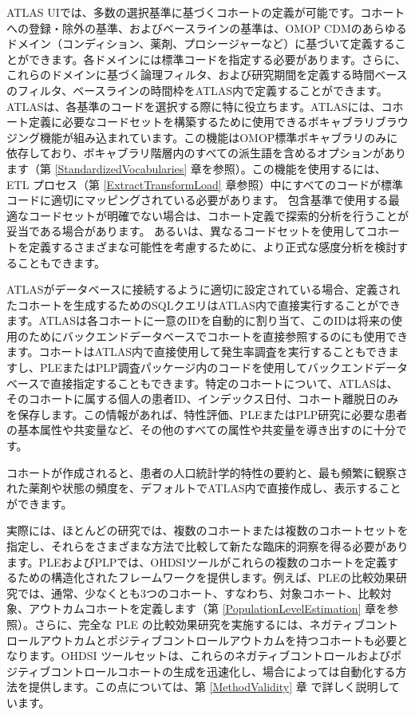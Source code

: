 \documentclass[
  11pt]{book}
\theoremstyle{definition}
\theoremstyle{definition}
\theoremstyle{definition}
\theoremstyle{definition}
\theoremstyle{remark}
\begin{document}
ATLAS UIでは、多数の選択基準に基づくコホートの定義が可能です。コホートへの登録・除外の基準、およびベースラインの基準は、OMOP CDMのあらゆるドメイン（コンディション、薬剤、プロシージャーなど）に基づいて定義することができます。各ドメインには標準コードを指定する必要があります。さらに、これらのドメインに基づく論理フィルタ、および研究期間を定義する時間ベースのフィルタ、ベースラインの時間枠をATLAS内で定義することができます。ATLASは、各基準のコードを選択する際に特に役立ちます。ATLASには、コホート定義に必要なコードセットを構築するために使用できるボキャブラリブラウジング機能が組み込まれています。この機能はOMOP標準ボキャブラリのみに依存しており、ボキャブラリ階層内のすべての派生語を含めるオプションがあります（第 \ref{StandardizedVocabularies} 章を参照）。この機能を使用するには、ETL プロセス（第 \ref{ExtractTransformLoad} 章参照）中にすべてのコードが標準コードに適切にマッピングされている必要があります。 包含基準で使用する最適なコードセットが明確でない場合は、コホート定義で探索的分析を行うことが妥当である場合があります。 あるいは、異なるコードセットを使用してコホートを定義するさまざまな可能性を考慮するために、より正式な感度分析を検討することもできます。

ATLASがデータベースに接続するように適切に設定されている場合、定義されたコホートを生成するためのSQLクエリはATLAS内で直接実行することができます。ATLASは各コホートに一意のIDを自動的に割り当て、このIDは将来の使用のためにバックエンドデータベースでコホートを直接参照するのにも使用できます。コホートはATLAS内で直接使用して発生率調査を実行することもできますし、PLEまたはPLP調査パッケージ内のコードを使用してバックエンドデータベースで直接指定することもできます。特定のコホートについて、ATLASは、そのコホートに属する個人の患者ID、インデックス日付、コホート離脱日のみを保存します。この情報があれば、特性評価、PLEまたはPLP研究に必要な患者の基本属性や共変量など、その他のすべての属性や共変量を導き出すのに十分です。

コホートが作成されると、患者の人口統計学的特性の要約と、最も頻繁に観察された薬剤や状態の頻度を、デフォルトでATLAS内で直接作成し、表示することができます。

実際には、ほとんどの研究では、複数のコホートまたは複数のコホートセットを指定し、それらをさまざまな方法で比較して新たな臨床的洞察を得る必要があります。PLEおよびPLPでは、OHDSIツールがこれらの複数のコホートを定義するための構造化されたフレームワークを提供します。例えば、PLEの比較効果研究では、通常、少なくとも3つのコホート、すなわち、対象コホート、比較対象、アウトカムコホートを定義します（第 \ref{PopulationLevelEstimation} 章を参照）。さらに、完全な PLE の比較効果研究を実施するには、ネガティブコントロールアウトカムとポジティブコントロールアウトカムを持つコホートも必要となります。OHDSI ツールセットは、これらのネガティブコントロールおよびポジティブコントロールコホートの生成を迅速化し、場合によっては自動化する方法を提供します。この点については、第 \ref{MethodValidity} 章 で詳しく説明しています。
\end{document}
